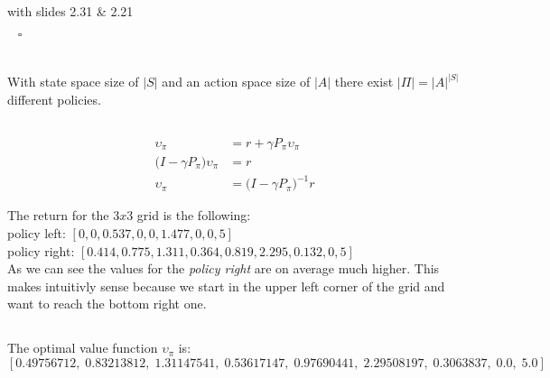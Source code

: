\documentclass[11pt,a4paper]{article}
\begin{document}
\begin{flushright}
    \begin{footnotesize}
        with slides 2.31 \& 2.21 
    \end{footnotesize}
    $\;\;\;\square$
\end{flushright}




\section{}

\subsection{}

With state space size of $|S|$ and an action space size of $|A|$ there exist $|\Pi|=|A|^{|S|}$ different policies.


\subsection{}

\begin{align*}
    \upsilon_{\pi} & = r + \gamma P_{\pi} \upsilon_{\pi} \\
    \big( I - \gamma P_{\pi} \bigr)\upsilon_{\pi}        & = r \\
    \upsilon_{\pi} & = \big( I - \gamma P_{\pi} \bigr)^{-1}r
\end{align*}

\flushleft
The return for the $3x3$ grid is the following:\\
\vspace{5pt}
policy left: $[0, 0, 0.537, 0, 0, 1.477, 0, 0, 5]$\\
policy right: $[0.414, 0.775, 1.311, 0.364, 0.819,  2.295, 0.132, 0, 5]$\\
\vspace{10pt}
As we can see the values for the \textit{policy right} are on average much higher. This makes intuitivly sense because we
start in the upper left corner of the grid and want to reach the bottom right one.


\subsection{}

The optimal value function $\upsilon_{\pi}$ is: \\
$[0.49756712,\; 0.83213812,\; 1.31147541,\; 0.53617147,\; 0.97690441,\; 2.29508197,\;
0.3063837,\; 0.0,\; 5.0]$
\end{document}
